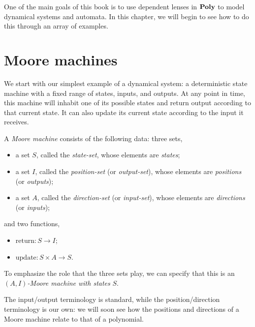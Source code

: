 \documentclass[Book-Poly]{subfiles}
\begin{document}
One of the main goals of this book is to use dependent lenses in $\mathbf{Poly}$ to model dynamical systems and automata.
In this chapter, we will begin to see how to do this through an array of examples.

\section{Moore machines}\label{sec.poly.dyn_sys.moore}


We start with our simplest example of a dynamical system: a deterministic state machine with a fixed range of states, inputs, and outputs.
At any point in time, this machine will inhabit one of its possible states and return output according to that current state. It can also update its current state according to the input it receives.

\begin{definition}\label{def.moore_machine}
  A \emph{Moore machine} consists of the following data: three sets,
  \begin{itemize}
    \item a set $S$, called the \emph{state-set}, whose elements are \emph{states};
    \item a set $I$, called the \emph{position-set} (or \emph{output-set}), whose elements are \emph{positions} (or \emph{outputs});
    \item a set $A$, called the \emph{direction-set} (or \emph{input-set}), whose elements are \emph{directions} (or \emph{inputs});
  \end{itemize}
  and two functions,
  \begin{itemize}
    \item $\text{return}\colon S\to I$;
    \item $\text{update}\colon S\times A\to S$.
  \end{itemize}
  To emphasize the role that the three sets play, we can specify that this is an $(A,I)$\emph{-Moore machine with states} $S$.
\end{definition}


The input/output terminology is standard, while the position/direction terminology is our own: we will soon see how the positions and directions of a Moore machine relate to that of a polynomial.
\end{document}
